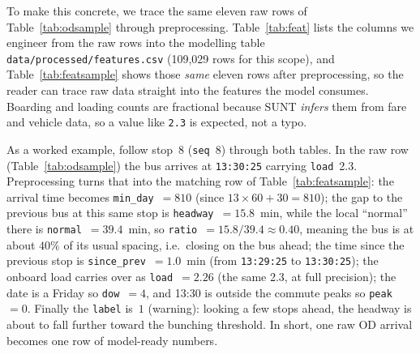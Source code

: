 \documentclass[11pt,a4paper]{article}
\begin{document}
To make this concrete, we trace the same eleven raw rows of Table~\ref{tab:odsample} through
preprocessing. Table~\ref{tab:feat} lists the columns we engineer from the raw rows into the
modelling table \texttt{data/processed/features.csv} (109{,}029 rows for this scope), and
Table~\ref{tab:featsample} shows those \emph{same} eleven rows after preprocessing, so the reader can
trace raw data straight into the features the model consumes. Boarding and loading counts are
fractional because SUNT \emph{infers} them from fare and vehicle data, so a value like \texttt{2.3}
is expected, not a typo.

As a worked example, follow stop~8 (\texttt{seq}~8) through both tables. In the raw row
(Table~\ref{tab:odsample}) the bus arrives at \texttt{13:30:25} carrying \texttt{load}~2.3.
Preprocessing turns that into the matching row of Table~\ref{tab:featsample}: the arrival time
becomes \texttt{min\_day}~$=810$ (since $13\times60+30=810$); the gap to the previous bus at this
same stop is \texttt{headway}~$=15.8$~min, while the local ``normal'' there is
\texttt{normal}~$=39.4$~min, so \texttt{ratio}~$=15.8/39.4\approx0.40$, meaning the bus is at about
$40\%$ of its usual spacing, i.e.\ closing on the bus ahead; the time since the previous stop is
\texttt{since\_prev}~$=1.0$~min (from \texttt{13:29:25} to \texttt{13:30:25}); the onboard load
carries over as \texttt{load}~$=2.26$ (the same 2.3, at full precision); the date is a Friday so
\texttt{dow}~$=4$, and 13:30 is outside the commute peaks so \texttt{peak}~$=0$. Finally the
\texttt{label} is~$1$ (warning): looking a few stops ahead, the headway is about to fall further
toward the bunching threshold. In short, one raw OD arrival becomes one row of model-ready numbers.
\end{document}
